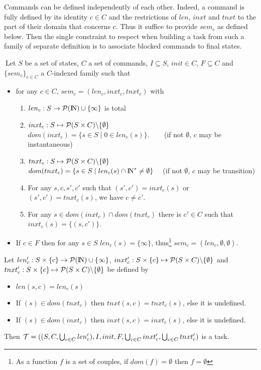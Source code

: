 \documentclass{article}
\newcommand{\NAT}{\mbox{\normalfont I$\!$N}}
\begin{document}
Commands can be defined independently of each other. Indeed, a command is fully defined by its identity $c\in C$ and the restrictions of $len$, $inxt$ and $tnxt$ to the part of their domain that concerns $c$. Thus it suffice to provide $sem_c$ as defined below. Then the single constraint to respect when building a task from such a family of separate definition is to associate blocked commands to final states.
\begin{fact} \label{fact-pcsem}$~$Let $S$ be a set of states, $C$ a set of commands, $I\subseteq S$, $init\in C$, $F\subseteq C$ and $\{sem_c\}_{c\in C}$ a $C$-indexed family such that
\begin{itemize}

\item for any $c\in C$, $sem_c=(len_c,inxt_c,tnxt_c)$ with
  \begin{enumerate}
	  \item $len_c:S\rightarrow{\cal P}(\NAT)\cup\{\infty\}$ is total
		\item $inxt_c: S\mapsto {\cal P}(S\times C)\backslash\{\emptyset\}$\\
		      $dom(inxt_c)=\{s\in S\mid 0\in len_c(s)\}$. $~~~~~~~~${\small(if not $\emptyset$, $c$ may be instantaneous)}
		\item $tnxt_c: S\mapsto {\cal P}(S\times C)\backslash\{\emptyset\}$\\
		      $dom(tnxt_c)=\{s\in S\mid len_c(s)\cap\NAT^*\neq\emptyset\}$ $~~~~${\small(if not $\emptyset$, $c$ may be transition)}
		\item For any $s,c,s',c'$ such that $(s',c')=inxt_c(s)$ or $(s',c')=tnxt_c(s)$, we have $c\neq c'$.
    \item For any $s\in dom(inxt_c)\cap dom(tnxt_c)$ there is $c'\in C$ such that $inxt_c(s)=\{(s,c')\}$.
	\end{enumerate}
\item If $c\in F$ then for any $s\in S$ $len_c(s)=\{\infty\}$, thus\footnote{As a function $f$ is a set of couples, if $dom(f)=\emptyset$ then $f=\emptyset$} $sem_c=(len_c,\emptyset,\emptyset)$.
\end{itemize}

Let $len'_c:S\times \{c\}\rightarrow{\cal P}(\NAT)\cup\{\infty\}$, $inxt'_c: S\times \{c\}\mapsto {\cal P}(S\times C)\backslash\{\emptyset\}$ and $tnxt'_c: S\times \{c\}\mapsto {\cal P}(S\times C)\backslash\{\emptyset\}$ be defined by
\begin{itemize}
\item $len(s,c)=len_c(s)$
\item If $(s)\in dom(tnxt_c)$ then $tnxt(s,c)=tnxt_c(s)$, else it is undefined.
\item If $(s)\in dom(inxt_c)$ then $inxt(s,c)=inxt_c(s)$, else it is undefined.
\end{itemize}
Then
${\cal T}=((S, C, \bigcup_{c\in C}len'_c), I, init, F, \bigcup_{c\in C}inxt'_c, \bigcup_{c\in C}tnxt'_c)$ is a task.
\end{fact}
\end{document}
